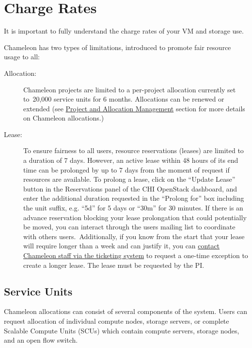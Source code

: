 \section{Charge Rates}
\label{C:cc-charge}

It is important to fully understand the charge rates of your VM and storage use.

Chameleon has two types of limitations, introduced to promote fair resource
usage to all:

\begin{description}

\item  [Allocation:] Chameleon projects are limited to a per-project allocation
  currently set to~20,000 service units for 6 months. Allocations can be
  renewed or extended (see
  \href{index.html\#toc-project-and-allocation-management}{Project and
  Allocation Management} section for more details on Chameleon
allocations.)

  \item [Lease:] To ensure fairness to all users, resource reservations (leases)
  are limited to a duration of 7 days. However, an active lease within
  48 hours of its end time can be prolonged by up to 7 days from the
  moment of request if resources are available. To prolong a lease,
  click on the ``Update Lease'' button in the Reservations panel of the
  CHI OpenStack dashboard, and enter the additional duration requested
  in the ``Prolong for'' box including the unit suffix, e.g. ``5d'' for
  5 days or ``30m'' for 30 minutes. If there is an advance reservation
  blocking your lease prolongation that could potentially be moved,
  you can interact through the users mailing list to coordinate with
  others  users.~Additionally, if you know from the start that your
  lease will  require longer than a week and can justify it, you can
  \href{https://www.chameleoncloud.org/user/help/ticket/new/}{contact
    Chameleon staff via the ticketing system} to request a one-time
  exception to create a longer lease. The lease must be requested by
  the PI.

\end{description}

\subsection{Service Units}

Chameleon allocations can consist of several components of the system.
Users can request allocation of individual compute nodes, storage
servers, or complete Scalable Compute Units (SCUs) which contain compute
servers, storage nodes, and an open flow switch.

